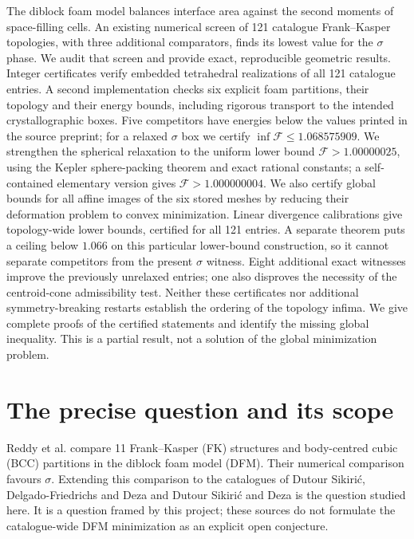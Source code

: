\documentclass[11pt,a4paper]{report}
\newcommand{\DF}{\mathcal F}
\begin{document}
\makepapertitle

\begin{paperabstract}
The diblock foam model balances interface area against the second moments of
space-filling cells. An existing numerical screen of 121 catalogue
Frank--Kasper topologies, with three additional comparators, finds its lowest
value for the $\sigma$ phase. We audit that screen and provide exact,
reproducible geometric results. Integer certificates verify embedded
tetrahedral realizations of all 121 catalogue entries. A second implementation
checks six explicit foam partitions, their topology and their energy bounds,
including rigorous transport to the intended crystallographic boxes. Five
competitors have energies below the values printed in the source preprint;
for a relaxed $\sigma$ box we certify $\inf\DF\leq1.068575909$.
We strengthen the spherical relaxation to the uniform lower bound
$\DF>1.00000025$, using the Kepler sphere-packing theorem and exact rational
constants; a self-contained elementary version gives $\DF>1.000000004$.
We also certify global bounds for all affine images of the six stored meshes
by reducing their deformation problem to convex minimization.
Linear divergence calibrations give topology-wide lower bounds, certified
for all 121 entries. A separate theorem puts a ceiling below $1.066$ on
this particular lower-bound construction, so it cannot separate competitors
from the present $\sigma$ witness.
Eight additional exact witnesses improve the previously unrelaxed entries;
one also disproves the necessity of the centroid-cone admissibility test.
Neither these certificates nor
additional symmetry-breaking restarts establish the ordering of the topology
infima. We give complete proofs of the certified statements and identify the
missing global inequality. This is a partial result, not a solution of the
global minimization problem.
\end{paperabstract}

\section{The precise question and its scope}

Reddy et al.\autocite{Reddy2018} compare 11 Frank--Kasper (FK) structures and
body-centred cubic (BCC) partitions in the diblock foam model (DFM). Their
numerical comparison favours $\sigma$. Extending this comparison to the
catalogues of Dutour Sikirić, Delgado-Friedrichs and Deza\autocite{Dutour2010}
and Dutour Sikirić and Deza\autocite{Dutour2012} is the question studied here.
It is a question framed by this project; these sources do not formulate the
catalogue-wide DFM minimization as an explicit open conjecture.
\end{document}
